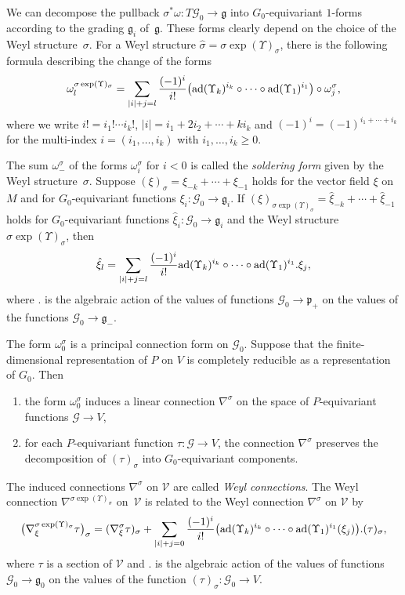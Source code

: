 \documentclass[10pt,a4paper]{amsart}
\newcommand{\om}{\omega}
\newcommand{\si}{\sigma}
\newcommand{\ba}{\mathcal{G}}
\newcommand{\fg}{\mathfrak g}
\newcommand{\fp}{\mathfrak p}
\newcommand{\na}{\nabla}
\newcommand{\U}{\Upsilon}
\newcommand{\ad}{{\rm ad}}
\numberwithin{equation}{section}
\begin{document}
We can decompose the pullback $\si^*\om\colon T\ba_0\to \fg$ into $G_0$-equivariant $1$-forms \smash{$\om_{i}^\si\colon T\ba_0\to \fg_i$} according to the grading $\fg_i$ of~$\fg$. These forms clearly depend on the choice of the Weyl struc\-tu\-re~$\si$. For a Weyl structure $\hat \si=\si \exp (\U)_\si$, there is the following formula describing the change of the forms
\begin{gather} \label{change-form}
\om_{l}^{\si\exp(\U)_\si}=\sum_{|i|+j=l} \frac{(-1)^{i}}{i!} \big( \ad(\U_k)^{i_k} \circ \cdots \circ \ad(\U_1)^{i_1}\big)\circ \om_{j}^\si,
\end{gather}
where we write $i!=i_1!\cdots i_k!$, $|i|=i_1+2i_2+ \cdots +ki_k$ and $(-1)^i=(-1)^{i_1+\cdots+i_k}$ for the multi-index $i=(i_1, \dots, i_k)$ with $i_1, \dots, i_k \geq 0$.

The sum $\om_-^\si$ of the forms $\om_{i}^\si$ for $i<0$ is called the \emph{soldering form} given by the Weyl structu\-re~$\si$. Suppose $(\xi)_{\si}=\xi_{-k}+ \cdots+ \xi_{-1}$ holds for the vector f\/ield $\xi$ on $M$ and for $G_0$-equivariant functions $\xi_i\colon \ba_0\to \fg_i$. If $(\xi)_{\si \exp (\U)_\si}=\hat \xi_{-k}+\cdots+\hat \xi_{-1}$ holds for $G_0$-equivariant functions $\hat \xi_i: \ba_0\to \fg_i$ and the Weyl structure $\si\exp (\U)_\si$, then
\begin{gather*}
\hat \xi_l=\sum_{|i|+j=l} \frac{(-1)^i}{i!} \ad(\U_k)^{i_k} \circ \cdots \circ \ad(\U_1)^{i_1}.\xi_{j},
\end{gather*}
where $.$ is the algebraic action of the values of functions $\ba_0\to \fp_+$ on the values of the functions $\ba_0\to \fg_-$.

The form $\om_{0}^\si$ is a principal connection form on $\ba_0$. Suppose that the f\/inite-dimensional representation of $P$ on $V$ is completely reducible as a representation of $G_0$. Then
\begin{enumerate}\itemsep=0pt
\item[1)] the form $\om_{0}^\si$ induces a linear connection $\nabla^\si$ on the space of $P$-equivariant functions $\ba\to V$,
\item[2)] for each $P$-equivariant function $\tau\colon \ba\to V$, the connection $\nabla^\si$ preserves the decomposition of $(\tau)_\si$ into $G_0$-equivariant components.
\end{enumerate}

The induced connections $\na^\si\!$ on $\mathcal{V}$ are called \emph{Weyl connections}. The Weyl connection $\na^{\si\exp (\U)_\si}\!\!$ on~$\mathcal{V}$ is related to the Weyl connection $\na^\si$ on $\mathcal{V}$ by
\begin{gather} \label{change-wc}
\big(\na^{\si\exp (\U)_\si }_\xi\tau\big)_\si =(\na^\si_\xi\tau)_\si + \sum_{|i|+j=0} \frac{(-1)^{i}}{i!} \big( \ad(\U_k)^{i_k} \circ \cdots \circ \ad(\U_1)^{i_1}(\xi_j)\big). (\tau)_\si,
\end{gather}
where $\tau$ is a section of $\mathcal{V}$ and $.$ is the algebraic action of the values of functions $\ba_0\to \fg_0$ on the values of the function $(\tau)_\si\colon \ba_0\to V$.
\end{document}
